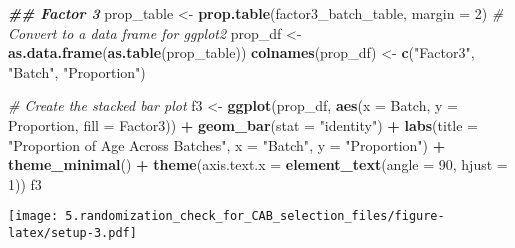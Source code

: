 \documentclass[
]{article}
\newenvironment{Shaded}{\begin{snugshade}}{\end{snugshade}}
\newcommand{\AttributeTok}[1]{\textcolor[rgb]{0.13,0.29,0.53}{#1}}
\newcommand{\CommentTok}[1]{\textcolor[rgb]{0.56,0.35,0.01}{\textit{#1}}}
\newcommand{\DecValTok}[1]{\textcolor[rgb]{0.00,0.00,0.81}{#1}}
\newcommand{\DocumentationTok}[1]{\textcolor[rgb]{0.56,0.35,0.01}{\textbf{\textit{#1}}}}
\newcommand{\FunctionTok}[1]{\textcolor[rgb]{0.13,0.29,0.53}{\textbf{#1}}}
\newcommand{\NormalTok}[1]{#1}
\newcommand{\OtherTok}[1]{\textcolor[rgb]{0.56,0.35,0.01}{#1}}
\newcommand{\SpecialCharTok}[1]{\textcolor[rgb]{0.81,0.36,0.00}{\textbf{#1}}}
\newcommand{\StringTok}[1]{\textcolor[rgb]{0.31,0.60,0.02}{#1}}
\begin{document}
\begin{Shaded}
\begin{Highlighting}[]
\DocumentationTok{\#\# Factor 3}
\NormalTok{prop\_table }\OtherTok{\textless{}{-}} \FunctionTok{prop.table}\NormalTok{(factor3\_batch\_table, }\AttributeTok{margin =} \DecValTok{2}\NormalTok{)}
\CommentTok{\# Convert to a data frame for ggplot2}
\NormalTok{prop\_df }\OtherTok{\textless{}{-}} \FunctionTok{as.data.frame}\NormalTok{(}\FunctionTok{as.table}\NormalTok{(prop\_table))}
\FunctionTok{colnames}\NormalTok{(prop\_df) }\OtherTok{\textless{}{-}} \FunctionTok{c}\NormalTok{(}\StringTok{"Factor3"}\NormalTok{, }\StringTok{"Batch"}\NormalTok{, }\StringTok{"Proportion"}\NormalTok{)}

\CommentTok{\# Create the stacked bar plot}
\NormalTok{f3 }\OtherTok{\textless{}{-}} \FunctionTok{ggplot}\NormalTok{(prop\_df, }\FunctionTok{aes}\NormalTok{(}\AttributeTok{x =}\NormalTok{ Batch, }\AttributeTok{y =}\NormalTok{ Proportion, }\AttributeTok{fill =}\NormalTok{ Factor3)) }\SpecialCharTok{+}
  \FunctionTok{geom\_bar}\NormalTok{(}\AttributeTok{stat =} \StringTok{"identity"}\NormalTok{) }\SpecialCharTok{+}
  \FunctionTok{labs}\NormalTok{(}\AttributeTok{title =} \StringTok{"Proportion of Age Across Batches"}\NormalTok{, }\AttributeTok{x =} \StringTok{"Batch"}\NormalTok{, }\AttributeTok{y =} \StringTok{"Proportion"}\NormalTok{) }\SpecialCharTok{+}
  \FunctionTok{theme\_minimal}\NormalTok{() }\SpecialCharTok{+}
  \FunctionTok{theme}\NormalTok{(}\AttributeTok{axis.text.x =} \FunctionTok{element\_text}\NormalTok{(}\AttributeTok{angle =} \DecValTok{90}\NormalTok{, }\AttributeTok{hjust =} \DecValTok{1}\NormalTok{))}
\NormalTok{f3}
\end{Highlighting}
\end{Shaded}

\texttt{[image: 5.randomization\_check\_for\_CAB\_selection\_files/figure-latex/setup-3.pdf]}

\begin{Shaded}
\end{Shaded}
\end{document}
